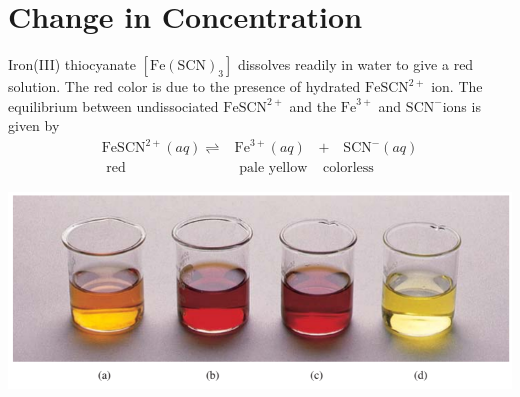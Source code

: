 \documentclass[a4paper,12pt,twocolumn]{article}
\begin{document}
\section{Change in Concentration}
Iron(III) thiocyanate $\left[\mathrm{Fe}(\mathrm{SCN})_3\right]$ dissolves readily in water to give a red solution. The red color is due to the presence of hydrated $\mathrm{FeSCN}^{2+}$ ion. The equilibrium between undissociated $\mathrm{FeSCN}^{2+}$ and the $\mathrm{Fe}^{3+}$ and $\mathrm{SCN}^{-}$ions is given by
$$
\begin{array}{ccc}
    \mathrm{FeSCN}^{2+}(a q) \rightleftharpoons & \mathrm{Fe}^{3+}(a q) & + \quad \mathrm{SCN}^{-}(a q) \\
    \text { red }                               & \text { pale yellow}  & \text{ colorless }            
\end{array}
$$
\begin{center}
    \includegraphics[width=.5\textwidth]{Screenshot 2023-03-23 001124.png}
\end{center}
\end{document}
